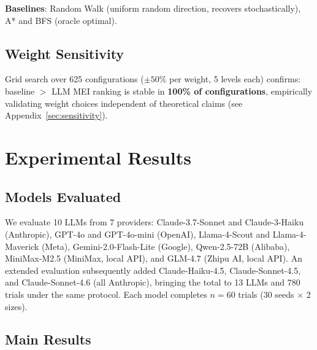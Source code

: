 \documentclass{article}
\begin{document}
\textbf{Baselines}: Random Walk (uniform random direction, recovers stochastically), A* and BFS (oracle optimal).

\subsection{Weight Sensitivity}

Grid search over 625 configurations ($\pm50$\% per weight, 5 levels each) confirms: baseline ${>}$ LLM MEI ranking is stable in \textbf{100\% of configurations}, empirically validating weight choices independent of theoretical claims (see Appendix~\ref{sec:sensitivity}).

\section{Experimental Results}

\subsection{Models Evaluated}

We evaluate 10 LLMs from 7 providers: Claude-3.7-Sonnet and Claude-3-Haiku (Anthropic), GPT-4o and GPT-4o-mini (OpenAI), Llama-4-Scout and Llama-4-Maverick (Meta), Gemini-2.0-Flash-Lite (Google), Qwen-2.5-72B (Alibaba), MiniMax-M2.5 (MiniMax, local API), and GLM-4.7 (Zhipu AI, local API).
An extended evaluation subsequently added Claude-Haiku-4.5, Claude-Sonnet-4.5, and Claude-Sonnet-4.6 (all Anthropic), bringing the total to 13 LLMs and 780 trials under the same protocol.
Each model completes $n{=}60$ trials (30 seeds $\times$ 2 sizes).

\subsection{Main Results}
\end{document}

